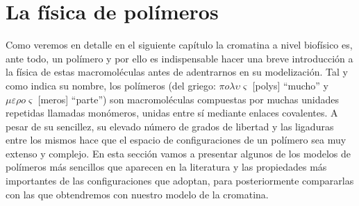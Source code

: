 \section{La física de polímeros}

Como veremos en detalle en el siguiente capítulo la cromatina a nivel biofísico es, ante todo, un polímero y por ello es indispensable hacer una breve introducción a la física de estas macromoléculas antes de adentrarnos en su modelización. Tal y como indica su nombre, los polímeros (del griego: $\pi o \lambda \upsilon \varsigma$ [polys] ``mucho'' y $\mu \varepsilon \rho o \varsigma$ [meros] ``parte'') son macromoléculas compuestas por muchas unidades repetidas llamadas monómeros, unidas entre sí mediante enlaces covalentes. A pesar de su sencillez, su elevado número de grados de libertad y las ligaduras entre los mismos hace que el espacio de configuraciones de un polímero sea muy extenso y complejo. En esta sección vamos a presentar algunos de los modelos de polímeros más sencillos que aparecen en la literatura y las propiedades más importantes de las configuraciones que adoptan, para posteriormente compararlas con las que obtendremos con nuestro modelo de la cromatina.

